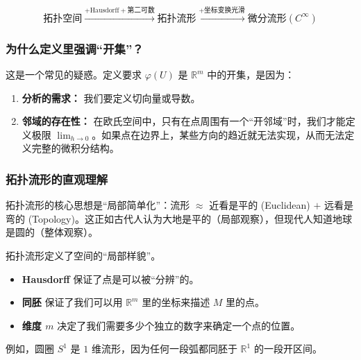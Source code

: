 \begin{myremark}[拓扑流形]
$$ \text{拓扑空间} \xrightarrow{+ \text{Hausdorff} + \text{第二可数}} \text{拓扑流形} \xrightarrow{+ \text{坐标变换光滑}} \text{微分流形} (C^\infty) $$

\subsubsection*{为什么定义里强调“开集”？}
这是一个常见的疑惑。定义要求 $\varphi(U)$ 是 $\mathbb{R}^m$ 中的开集，是因为：
\begin{enumerate}
\item \textbf{分析的需求：} 我们要定义切向量或导数。
\item \textbf{邻域的存在性：} 在欧氏空间中，只有在点周围有一个“开邻域”时，我们才能定义极限 $\lim_{h \to 0}$。如果点在边界上，某些方向的趋近就无法实现，从而无法定义完整的微积分结构。
\end{enumerate}

\subsubsection*{拓扑流形的直观理解}

拓扑流形的核心思想是“局部简单化”：流形 $\approx$ 近看是平的 (Euclidean) $+$ 远看是弯的 (Topology)。这正如古代人认为大地是平的（局部观察），但现代人知道地球是圆的（整体观察）。

拓扑流形定义了空间的“局部样貌”。

\begin{itemize}
\item \textbf{Hausdorff} 保证了点是可以被“分辨”的。
\item \textbf{同胚} 保证了我们可以用 $\mathbb{R}^m$ 里的坐标来描述 $M$ 里的点。
\item \textbf{维度 $m$} 决定了我们需要多少个独立的数字来确定一个点的位置。
\end{itemize}
例如，圆圈 $S^1$ 是 $1$ 维流形，因为任何一段弧都同胚于 $\mathbb{R}^1$ 的一段开区间。

\begin{center}
\end{center}
\end{myremark}
